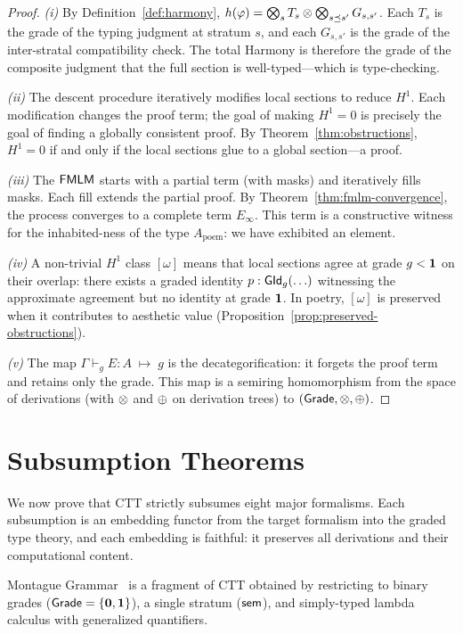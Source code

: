 \begin{proof}
\emph{(i)}
By Definition~\ref{def:harmony}, $h(\varphi) = \bigotimes_s T_s
\otimes \bigotimes_{s \preceq s'} G_{s,s'}$.  Each $T_s$ is the grade
of the typing judgment at stratum $s$, and each $G_{s,s'}$ is the
grade of the inter-stratal compatibility check.  The total Harmony
is therefore the grade of the composite judgment that the full
section is well-typed---which is type-checking.

\emph{(ii)}
The descent procedure iteratively modifies local sections to reduce
$H^1$.  Each modification changes the proof term; the goal of making
$H^1 = 0$ is precisely the goal of finding a globally consistent
proof.  By Theorem~\ref{thm:obstructions}, $H^1 = 0$ if and only
if the local sections glue to a global section---a proof.

\emph{(iii)}
The $\mathsf{FMLM}$ starts with a partial term (with masks) and iteratively
fills masks.  Each fill extends the partial proof.  By
Theorem~\ref{thm:fmlm-convergence}, the process converges to a
complete term $E_\infty$.  This term is a constructive witness for
the inhabited-ness of the type $A_{\mathrm{poem}}$: we have
exhibited an element.

\emph{(iv)}
A non-trivial $H^1$ class $[\omega]$ means that local sections agree
at grade $g < \mathbf{1}$ on their overlap: there exists a graded identity
$p : \mathsf{GId}_g(\ldots)$ witnessing the approximate agreement but no
identity at grade $\mathbf{1}$.  In poetry, $[\omega]$ is preserved when
it contributes to aesthetic value (Proposition~\ref{prop:preserved-obstructions}).

\emph{(v)}
The map $\Gamma \vdash_g E : A \;\mapsto\; g$ is the
decategorification: it forgets the proof term and retains only the
grade.  This map is a semiring homomorphism from the space of
derivations (with $\otimes$ and $\oplus$ on derivation trees) to
$(\mathsf{Grade}, \otimes, \oplus)$.
\end{proof}

\section{Subsumption Theorems}
\label{sec:subsumption}

We now prove that CTT strictly subsumes eight major formalisms.
Each subsumption is an embedding functor from the target formalism
into the graded type theory, and each embedding is faithful: it
preserves all derivations and their computational content.

\begin{theorem}
\label{thm:sub-montague}
Montague Grammar~\cite{montague1973} is a fragment of CTT obtained
by restricting to binary grades ($\mathsf{Grade} = \{\mathbf{0}, \mathbf{1}\}$),
a single stratum ($\mathsf{sem}$), and simply-typed lambda calculus with
generalized quantifiers.
\end{theorem}

